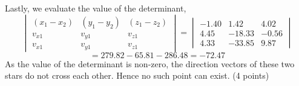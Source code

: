 \begin{description}
  Lastly, we evaluate the value of the determinant,
  \[ \begin{vmatrix}
     (x_1 - x_2) & (y_1 - y_2) & (z_1 - z_2)\\
     v_{x1} & v_{y1} & v_{z1}\\
     v_{x1} & v_{y1} & v_{z1}
     \end{vmatrix}
   = \begin{vmatrix}
     -1.40 & 1.42 & 4.02\\
     4.45 & -18.33 & -0.56\\
     4.33 & -33.85 & 9.87
     \end{vmatrix} \]
  \[ = 279.82 - 65.81 - 286.48 = -72.47 \]
  As the value of the determinant is non-zero, the direction vectors of
  these two stars do not cross each other. Hence no such point can exist.
  \hfill(4 points)
\end{description}
